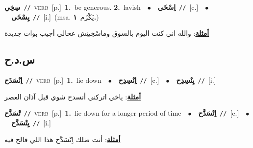 \documentclass[10pt,a4paper,twoside]{article} %
\begin{document}
\begin{multicols}{2}
{\setlength\topsep{0pt}\textbf{\foreignlanguage{arabic}{سِخِي}}\ {\color{gray}\texttt{//}\color{black}}\ \textsc{verb}\ [p.]\ \textbf{1.}~be generous.  \textbf{2.}~lavish\ \ $\bullet$\ \ \setlength\topsep{0pt}\textbf{\foreignlanguage{arabic}{اِسْخَى}}\ {\color{gray}\texttt{//}\color{black}}\ [c.]\ \ $\bullet$\ \ \setlength\topsep{0pt}\textbf{\foreignlanguage{arabic}{يِسْخَى}}\ {\color{gray}\texttt{//}\color{black}}\ [i.]\ \color{gray}(msa. \foreignlanguage{arabic}{يَكْرُم}~\foreignlanguage{arabic}{\textbf{١.}})\color{black}\  \begin{flushright}\color{gray}\foreignlanguage{arabic}{\textbf{\underline{\foreignlanguage{arabic}{أمثلة}}}: والله اني كنت اليوم بالسوق وماسْخِيتِش عحالي أجيب بوات جديدة}\end{flushright}\color{black}} \vspace{2mm}

\vspace{-3mm}
\subsection*{\color{blue}\foreignlanguage{arabic}{س.د.ح}\color{blue}{}} 

{\setlength\topsep{0pt}\textbf{\foreignlanguage{arabic}{اِنْسَدَح}}\ {\color{gray}\texttt{//}\color{black}}\ \textsc{verb}\ [p.]\ \textbf{1.}~lie down\ \ $\bullet$\ \ \setlength\topsep{0pt}\textbf{\foreignlanguage{arabic}{اِنْسِدِح}}\ {\color{gray}\texttt{//}\color{black}}\ [c.]\ \ $\bullet$\ \ \setlength\topsep{0pt}\textbf{\foreignlanguage{arabic}{يِنْسِدِح}}\ {\color{gray}\texttt{//}\color{black}}\ [i.]\  \begin{flushright}\color{gray}\foreignlanguage{arabic}{\textbf{\underline{\foreignlanguage{arabic}{أمثلة}}}: ياخي اتركني أنسدح شوي قبل آذان العصر}\end{flushright}\color{black}} \vspace{2mm}

{\setlength\topsep{0pt}\textbf{\foreignlanguage{arabic}{تْسَدَّح}}\ {\color{gray}\texttt{//}\color{black}}\ \textsc{verb}\ [p.]\ \textbf{1.}~lie down for a longer period of time\ \ $\bullet$\ \ \setlength\topsep{0pt}\textbf{\foreignlanguage{arabic}{اِتْسَدَّح}}\ {\color{gray}\texttt{//}\color{black}}\ [c.]\ \ $\bullet$\ \ \setlength\topsep{0pt}\textbf{\foreignlanguage{arabic}{يِتْسَدَّح}}\ {\color{gray}\texttt{//}\color{black}}\ [i.]\  \begin{flushright}\color{gray}\foreignlanguage{arabic}{\textbf{\underline{\foreignlanguage{arabic}{أمثلة}}}: أنت ضلك اِتْسَدَّح هذا اللي فالح فيه}\end{flushright}\color{black}} \vspace{2mm}


\end{multicols}
\end{document}
